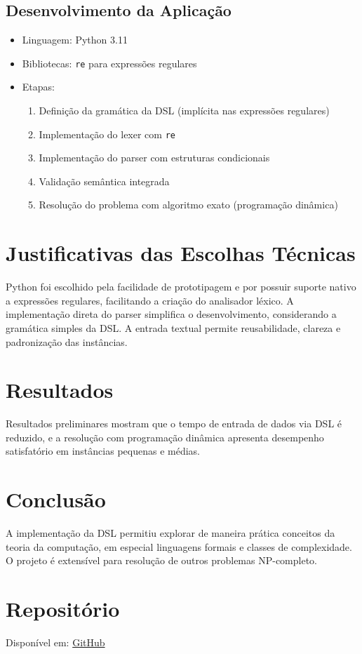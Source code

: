 \documentclass[conference]{IEEEtran}
\begin{document}
\subsection{Desenvolvimento da Aplicação}
\begin{itemize}
    \item Linguagem: Python 3.11
    \item Bibliotecas: \texttt{re} para expressões regulares
    \item Etapas:
    \begin{enumerate}
        \item Definição da gramática da DSL (implícita nas expressões regulares)
        \item Implementação do lexer com \texttt{re}
        \item Implementação do parser com estruturas condicionais
        \item Validação semântica integrada
        \item Resolução do problema com algoritmo exato (programação dinâmica)
    \end{enumerate}
\end{itemize}

\section{Justificativas das Escolhas Técnicas}
Python foi escolhido pela facilidade de prototipagem e por possuir suporte nativo a expressões regulares, facilitando a criação do analisador léxico. A implementação direta do parser simplifica o desenvolvimento, considerando a gramática simples da DSL. A entrada textual permite reusabilidade, clareza e padronização das instâncias.

\section{Resultados}
Resultados preliminares mostram que o tempo de entrada de dados via DSL é reduzido, e a resolução com programação dinâmica apresenta desempenho satisfatório em instâncias pequenas e médias.

\section{Conclusão}
A implementação da DSL permitiu explorar de maneira prática conceitos da teoria da computação, em especial linguagens formais e classes de complexidade. O projeto é extensível para resolução de outros problemas NP-completo.

\section*{Repositório}
Disponível em: \href{https://github.com/Guilherme-del/uniararas/blob/master/python/teoriaCompiladores/n2/proj/main.py}{GitHub}



\end{document}
